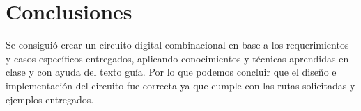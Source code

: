 \documentclass[a4paper]{article}
\begin{document}
\newpage
\section{Conclusiones}
Se consiguió crear un circuito digital combinacional en base a los requerimientos y casos específicos entregados, aplicando conocimientos y técnicas aprendidas en clase y con ayuda del texto guía. Por lo que podemos concluir que el diseño e implementación del circuito fue correcta ya que cumple con las rutas solicitadas y ejemplos entregados.
\end{document}
